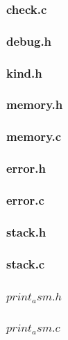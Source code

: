 \documentclass[a4paper,10pt,titlepage]{report}
\begin{document}
\subsubsection{check.c}


\subsubsection{debug.h}



\subsubsection{kind.h}


\subsubsection{memory.h}


\subsubsection{memory.c}


\subsubsection{error.h}


\subsubsection{error.c}


\subsubsection{stack.h}


\subsubsection{stack.c}


\subsubsection{$print_asm.h$}


\subsubsection{$print_asm.c$}

\end{document}
